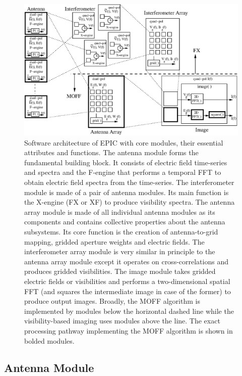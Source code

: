 \documentclass[a4paper,fleqn,usenatbib]{mnras}
\begin{document}
\begin{figure}
  \includegraphics[width=\linewidth]{figureA1}
  \caption{Software architecture of EPIC with core modules, their essential
    attributes and functions. The antenna module forms the fundamental building 
    block. It consists of electric field time-series and spectra and the 
    F-engine that performs a temporal FFT to obtain electric field spectra from 
    the time-series. The interferometer module is made of a pair of antenna 
    modules. Its main function is the X-engine (FX or XF) to produce visibility 
    spectra. The antenna array module is made of all individual antenna modules
    as its components and contains collective properties about the antenna 
    subsystems. Its core function is the creation of antenna-to-grid mapping, 
    gridded aperture weights and electric fields. The interferometer array 
    module is very similar in principle to the antenna array module except it 
    operates on cross-correlations and produces gridded visibilities. The image 
    module takes gridded electric fields or visibilities and performs a 
    two-dimensional spatial FFT (and squares the intermediate image in case 
    of the former) to produce output images. Broadly, the MOFF algorithm is 
    implemented by modules below the horizontal dashed line while the 
    visibility-based imaging uses modules above the line. The exact processing 
    pathway implementing the MOFF algorithm is shown in bolded modules.}
  \label{fig:software-modules}
\end{figure}

\subsection{Antenna Module}
\end{document}
